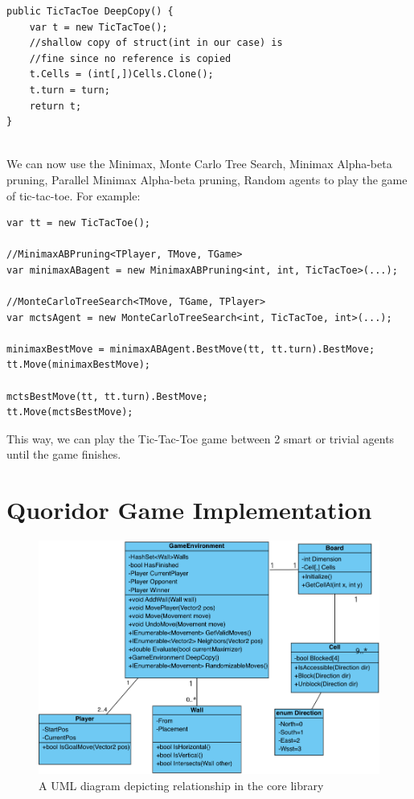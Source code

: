 \begin{lstlisting}
public TicTacToe DeepCopy() {
    var t = new TicTacToe();
    //shallow copy of struct(int in our case) is
    //fine since no reference is copied
    t.Cells = (int[,])Cells.Clone();
    t.turn = turn;
    return t;
}
\end{lstlisting}
\\
We can now use the Minimax, Monte Carlo Tree Search, Minimax Alpha-beta pruning, Parallel Minimax Alpha-beta pruning, Random agents to play the game of tic-tac-toe. For example:

\begin{lstlisting}
var tt = new TicTacToe();

//MinimaxABPruning<TPlayer, TMove, TGame>
var minimaxABagent = new MinimaxABPruning<int, int, TicTacToe>(...);

//MonteCarloTreeSearch<TMove, TGame, TPlayer>
var mctsAgent = new MonteCarloTreeSearch<int, TicTacToe, int>(...);

minimaxBestMove = minimaxABAgent.BestMove(tt, tt.turn).BestMove;
tt.Move(minimaxBestMove);

mctsBestMove(tt, tt.turn).BestMove;
tt.Move(mctsBestMove);
\end{lstlisting}

This way, we can play the Tic-Tac-Toe game between 2 smart or trivial agents until the game finishes.

\section{Quoridor Game Implementation}

\begin{figure}[h]
    \centering
    \includegraphics[width=.95\linewidth]{../img/uml_core.png}
    \caption{A UML diagram depicting relationship in the core library}
    \label{fig:core_uml}
\end{figure}

